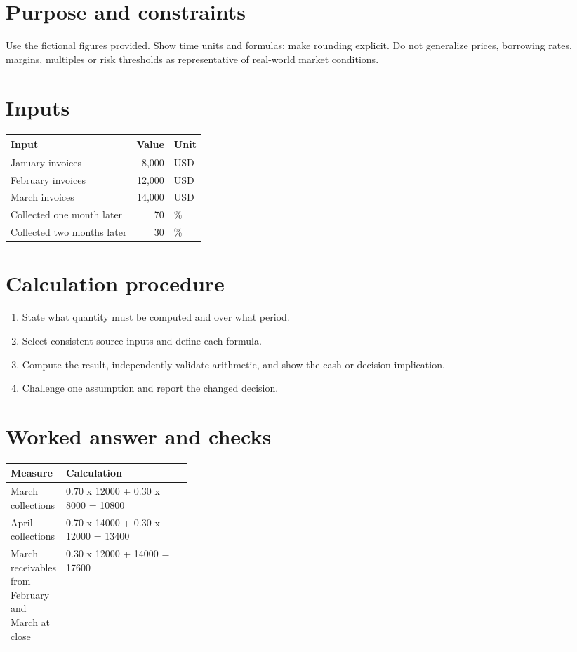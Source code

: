 \documentclass[11pt]{article}
\begin{document}
\SuiteOpen
\section{Purpose and constraints}
Use the fictional figures provided. Show time units and formulas; make rounding explicit. Do not generalize prices, borrowing rates, margins, multiples or risk thresholds as representative of real-world market conditions.
\section{Inputs}
\begin{tabularx}{\linewidth}{@{}Y r l@{}}\toprule Input & Value & Unit\\\midrule
January invoices & 8,000 & USD\\
February invoices & 12,000 & USD\\
March invoices & 14,000 & USD\\
Collected one month later & 70 & \%\\
Collected two months later & 30 & \%\\
\bottomrule\end{tabularx}
\section{Calculation procedure}
\begin{enumerate}[leftmargin=*,itemsep=5pt]
\item State what quantity must be computed and over what period.
\item Select consistent source inputs and define each formula.
\item Compute the result, independently validate arithmetic, and show the cash or decision implication.
\item Challenge one assumption and report the changed decision.
\end{enumerate}

\section{Worked answer and checks}
\begin{tabularx}{\linewidth}{@{}p{0.30\linewidth}Y@{}}\toprule Measure & Calculation\\\midrule
March collections & 0.70 x 12000 + 0.30 x 8000 = 10800\\
April collections & 0.70 x 14000 + 0.30 x 12000 = 13400\\
March receivables from February and March at close & 0.30 x 12000 + 14000 = 17600\\
\bottomrule\end{tabularx}
\end{document}
